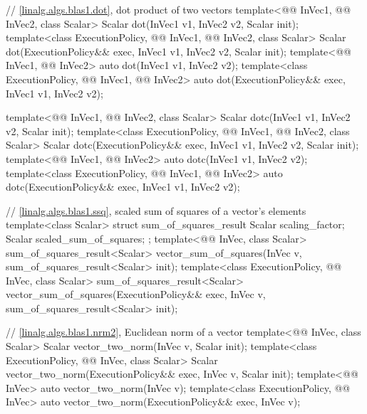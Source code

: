 \begin{codeblock}
{  // \ref{linalg.algs.blas1.dot}, dot product of two vectors
  template<@@ InVec1, @@ InVec2, class Scalar>
    Scalar dot(InVec1 v1, InVec2 v2, Scalar init);
  template<class ExecutionPolicy, @@ InVec1, @@ InVec2, class Scalar>
    Scalar dot(ExecutionPolicy&& exec,
               InVec1 v1, InVec2 v2, Scalar init);
  template<@@ InVec1, @@ InVec2>
    auto dot(InVec1 v1, InVec2 v2);
  template<class ExecutionPolicy, @@ InVec1, @@ InVec2>
    auto dot(ExecutionPolicy&& exec,
             InVec1 v1, InVec2 v2);

  template<@@ InVec1, @@ InVec2, class Scalar>
    Scalar dotc(InVec1 v1, InVec2 v2, Scalar init);
  template<class ExecutionPolicy, @@ InVec1, @@ InVec2, class Scalar>
    Scalar dotc(ExecutionPolicy&& exec,
                InVec1 v1, InVec2 v2, Scalar init);
  template<@@ InVec1, @@ InVec2>
    auto dotc(InVec1 v1, InVec2 v2);
  template<class ExecutionPolicy, @@ InVec1, @@ InVec2>
    auto dotc(ExecutionPolicy&& exec,
              InVec1 v1, InVec2 v2);

  // \ref{linalg.algs.blas1.ssq}, scaled sum of squares of a vector's elements
  template<class Scalar>
    struct sum_of_squares_result {
      Scalar scaling_factor;
      Scalar scaled_sum_of_squares;
    };
  template<@@ InVec, class Scalar>
    sum_of_squares_result<Scalar>
      vector_sum_of_squares(InVec v, sum_of_squares_result<Scalar> init);
  template<class ExecutionPolicy, @@ InVec, class Scalar>
    sum_of_squares_result<Scalar>
      vector_sum_of_squares(ExecutionPolicy&& exec,
                            InVec v, sum_of_squares_result<Scalar> init);

  // \ref{linalg.algs.blas1.nrm2}, Euclidean norm of a vector
  template<@@ InVec, class Scalar>
    Scalar vector_two_norm(InVec v, Scalar init);
  template<class ExecutionPolicy, @@ InVec, class Scalar>
    Scalar vector_two_norm(ExecutionPolicy&& exec, InVec v, Scalar init);
  template<@@ InVec>
    auto vector_two_norm(InVec v);
  template<class ExecutionPolicy, @@ InVec>
    auto vector_two_norm(ExecutionPolicy&& exec, InVec v);

}
\end{codeblock}
